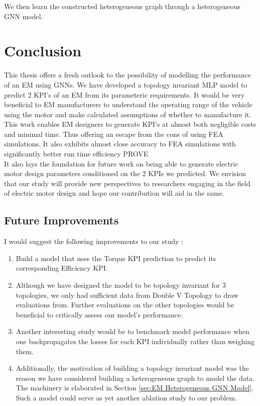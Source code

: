 \documentclass{report} %
\begin{document}
We then learn the constructed heterogeneous graph through a heterogeneous \ac{GNN} model.\\   

\newpage 

\chapter{Conclusion}

This thesis offers a fresh outlook to the possibility of modelling the performance of an \ac{EM} using \ac{GNN}s.
We have developed a topology invariant \ac{MLP} model to predict 2 \ac{KPI}'s of an \ac{EM} from its parameteric requirements. 
It would be very beneficial to \ac{EM} manufacturers to understand the operating range of the vehicle using the motor and make calculated assumptions of whether to manufacture it.\\
This work enables \ac{EM} designers to generate \ac{KPI}'s at almost both negligible costs and minimal time.
Thus offering an escape from the cons of using \ac{FEA} simulations. It also exhibits almost close accuracy to \ac{FEA} simulations with significantly better run time efficiency PROVE\\
It also lays the foundation for future work on being able to generate electric motor design parameters conditioned on the 2 KPIs we predicted.
We envision that our study will provide new perspectives to researchers engaging in the field of electric motor design and hope our contribution will aid in the same.\\
\section{Future Improvements}\label{sec:Future Improvements}

I would suggest the following improvements to our study : 

\begin{enumerate}
    \item Build a model that uses the Torque \ac{KPI} prediction to predict its corresponding Efficiency \ac{KPI}. 
    \item Although we have designed the model to be topology invariant for 3 topologies, we only had sufficient data from Double V Topology to draw evaluations from.
    Further evaluations on the other topologies would be beneficial to critically assess our model's performance.
    \item Another interesting study would be to benchmark model performance when one backpropagates the losses for each \ac{KPI} individually rather than weighing them.
    \item Additionally, the motivation of building a topology invariant model was the reason we have considered building a heterogeneous graph to model the data. The machinery is elaborated in Section \ref{sec:EM Heterogeneous GNN Model}.
    Such a model could serve as yet another ablation study to our problem.
\end{enumerate}
\end{document}
